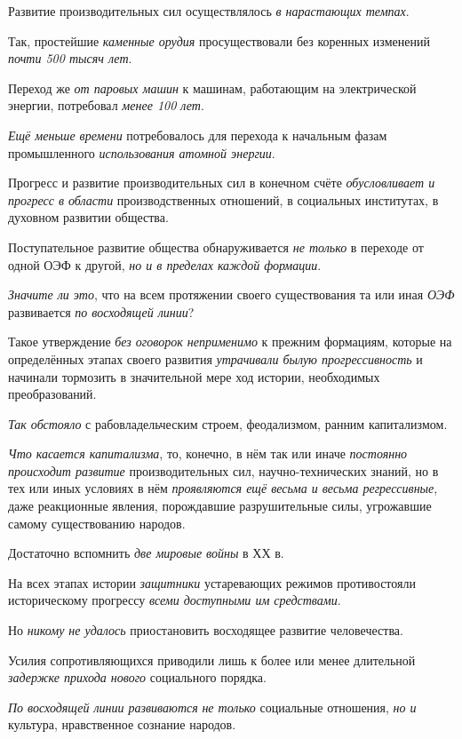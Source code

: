 \documentclass[a4paper,14pt,russian]{extreport}
\begin{document}
Развитие производительных сил осуществлялось \emph{в нарастающих темпах}.

Так, простейшие \emph{каменные орудия} просуществовали без коренных изменений \emph{почти 500 тысяч лет}.

Переход же \emph{от паровых машин} к машинам, работающим на электрической энергии, потребовал \emph{менее 100 лет}.

\emph{Ещё меньше времени} потребовалось для перехода к начальным фазам промышленного \emph{использования атомной энергии}.

Прогресс и развитие производительных сил в конечном счёте \emph{обусловливает и прогресс в области} производственных отношений, в социальных институтах, в духовном развитии общества.

Поступательное развитие общества обнаруживается \emph{не только} в переходе от одной ОЭФ к другой, \emph{но и в пределах каждой формации}.

\emph{Значите ли это}, что на всем протяжении своего существования та или иная \emph{ОЭФ} развивается \emph{по восходящей линии}?

Такое утверждение \emph{без оговорок неприменимо} к прежним формациям, которые на определённых этапах своего развития \emph{утрачивали былую прогрессивность} и начинали тормозить в значительной мере ход истории, необходимых преобразований.

\emph{Так обстояло} с рабовладельческим строем, феодализмом, ранним капитализмом.

\emph{Что касается капитализма}, то, конечно, в нём так или иначе \emph{постоянно происходит развитие} производительных сил, научно-технических знаний, но в тех или иных условиях в нём \emph{проявляются ещё весьма и весьма регрессивные}, даже реакционные явления, порождавшие разрушительные силы, угрожавшие самому существованию народов.

Достаточно вспомнить \emph{две мировые войны} в ХХ в.

На всех этапах истории \emph{защитники} устаревающих режимов противостояли историческому прогрессу \emph{всеми доступными им средствами}.

Но \emph{никому не удалось} приостановить восходящее развитие человечества.

Усилия сопротивляющихся приводили лишь к более или менее длительной \emph{задержке прихода нового} социального порядка.

\emph{По восходящей линии развиваются} \emph{не только} социальные отношения, \emph{но и} культура, нравственное сознание народов.
\end{document}
